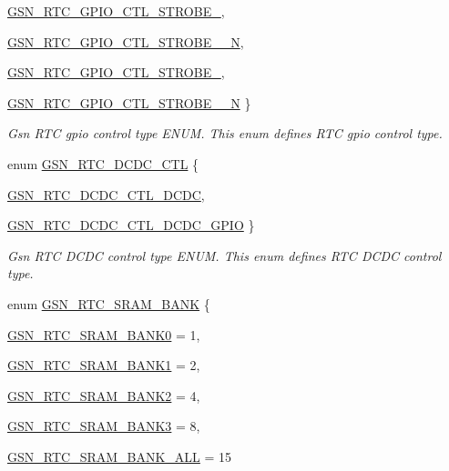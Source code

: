 \begin{DoxyCompactItemize}
\hyperlink{a00651_gga3481de456997229518bb1895981bfd74a344e9ded945d7d2b627a17c04a980c62}{GSN\_\-RTC\_\-GPIO\_\-CTL\_\-STROBE\_}, 
\par
\hyperlink{a00651_gga3481de456997229518bb1895981bfd74acc022991bbbfc2142c05b2ad8183fe16}{GSN\_\-RTC\_\-GPIO\_\-CTL\_\-STROBE\_\_\-N}, 
\par
\hyperlink{a00651_gga3481de456997229518bb1895981bfd74a6b4bbf344813dfbfd8632a50aa7101c3}{GSN\_\-RTC\_\-GPIO\_\-CTL\_\-STROBE\_}, 
\par
\hyperlink{a00651_gga3481de456997229518bb1895981bfd74a56a87191f515554c1285609343679e85}{GSN\_\-RTC\_\-GPIO\_\-CTL\_\-STROBE\_\_\-N}
 \}
\begin{DoxyCompactList}\small\item\em Gsn RTC gpio control type ENUM. This enum defines RTC gpio control type. \end{DoxyCompactList}\item 
enum \hyperlink{a00651_ga9b99af1b9b8d009d88640121a1de2e9d}{GSN\_\-RTC\_\-DCDC\_\-CTL} \{ \par
\hyperlink{a00651_gga9b99af1b9b8d009d88640121a1de2e9daf3e684018015ab18cce64c594a75bd62}{GSN\_\-RTC\_\-DCDC\_\-CTL\_\-DCDC}, 
\par
\hyperlink{a00651_gga9b99af1b9b8d009d88640121a1de2e9da0ac25212aa150f2e80f8b0d4e956d763}{GSN\_\-RTC\_\-DCDC\_\-CTL\_\-DCDC\_\-GPIO}
 \}
\begin{DoxyCompactList}\small\item\em Gsn RTC DCDC control type ENUM. This enum defines RTC DCDC control type. \end{DoxyCompactList}\item 
enum \hyperlink{a00651_ga77c3be59f640309dc97a21e937aa9b3c}{GSN\_\-RTC\_\-SRAM\_\-BANK} \{ \par
\hyperlink{a00651_gga77c3be59f640309dc97a21e937aa9b3caa481224f5d0b2b672d7c38b1d3cc5383}{GSN\_\-RTC\_\-SRAM\_\-BANK0} =  1, 
\par
\hyperlink{a00651_gga77c3be59f640309dc97a21e937aa9b3caf3331fec66ab355fcd5fca5f462288e0}{GSN\_\-RTC\_\-SRAM\_\-BANK1} =  2, 
\par
\hyperlink{a00651_gga77c3be59f640309dc97a21e937aa9b3cacb7bb34d2570a60af50b8439087c8082}{GSN\_\-RTC\_\-SRAM\_\-BANK2} =  4, 
\par
\hyperlink{a00651_gga77c3be59f640309dc97a21e937aa9b3ca3627ad8546d0cfcb89da5f16d6679a70}{GSN\_\-RTC\_\-SRAM\_\-BANK3} =  8, 
\par
\hyperlink{a00651_gga77c3be59f640309dc97a21e937aa9b3ca26e2b1b8786c612a464c7b638e13c308}{GSN\_\-RTC\_\-SRAM\_\-BANK\_\-ALL} =  15

\end{DoxyCompactItemize}
